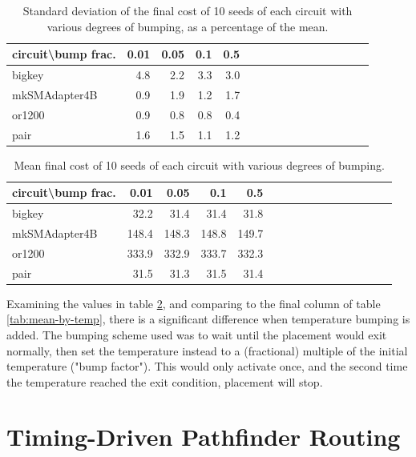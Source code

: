 \documentclass[11pt]{article}
\begin{document}
\begin{table}
\centering
\begin{tabular}{l | *{15}r}
\hline\hline
circuit\textbackslash bump frac. & 0.01 & 0.05 & 0.1 & 0.5 \\
\hline
bigkey & 4.8 & 2.2 & 3.3 & 3.0 \\
mkSMAdapter4B & 0.9 & 1.9 & 1.2 & 1.7 \\
or1200 & 0.9 & 0.8 & 0.8 & 0.4 \\
pair & 1.6 & 1.5 & 1.1 & 1.2 \\
\hline\hline
\end{tabular}
\caption{Standard deviation of the final cost of 10 seeds of each circuit with various degrees of bumping, as a percentage of the mean. }
\label{tab:stddev-by-temp-as-percent-bump}
\end{table}

\begin{table}[h]
\centering
\begin{tabular}{l | *{15}r}
\hline\hline
circuit\textbackslash bump frac. & 0.01 & 0.05 & 0.1 & 0.5 \\
\hline
bigkey & 32.2 & 31.4 & 31.4 & 31.8 \\
mkSMAdapter4B & 148.4 & 148.3 & 148.8 & 149.7 \\
or1200 & 333.9 & 332.9 & 333.7 & 332.3 \\
pair & 31.5 & 31.3 & 31.5 & 31.4 \\
\hline\hline
\end{tabular}
\caption{Mean final cost of 10 seeds of each circuit with various degrees of bumping. }
\label{tab:mean-by-temp-bump}
\end{table}

Examining the values in table \ref{tab:mean-by-temp-bump}, and comparing to the final column of table \ref{tab:mean-by-temp}, there is a significant difference when temperature bumping is added. The bumping scheme used was to wait until the placement would exit normally, then set the temperature instead to a (fractional) multiple of the initial temperature ("bump factor"). This would only activate once, and the second time the temperature reached the exit condition, placement will stop.

\section{Timing-Driven Pathfinder Routing}
\end{document}
